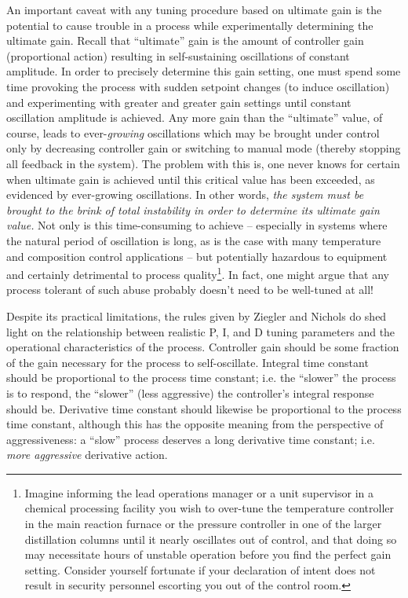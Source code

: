 An important caveat with any tuning procedure based on ultimate gain is the potential to cause trouble in a process while experimentally determining the ultimate gain.  Recall that ``ultimate'' gain is the amount of controller gain (proportional action) resulting in self-sustaining oscillations of constant amplitude.  In order to precisely determine this gain setting, one must spend some time provoking the process with sudden setpoint changes (to induce oscillation) and experimenting with greater and greater gain settings until constant oscillation amplitude is achieved.  Any more gain than the ``ultimate'' value, of course, leads to ever-\textit{growing} oscillations which may be brought under control only by decreasing controller gain or switching to manual mode (thereby stopping all feedback in the system).  The problem with this is, one never knows for certain when ultimate gain is achieved until this critical value has been exceeded, as evidenced by ever-growing oscillations.  In other words, \textit{ the system must be brought to the brink of total instability in order to determine its ultimate gain value.}  Not only is this time-consuming to achieve -- especially in systems where the natural period of oscillation is long, as is the case with many temperature and composition control applications -- but potentially hazardous to equipment and certainly detrimental to process quality\footnote{Imagine informing the lead operations manager or a unit supervisor in a chemical processing facility you wish to over-tune the temperature controller in the main reaction furnace or the pressure controller in one of the larger distillation columns until it nearly oscillates out of control, and that doing so may necessitate hours of unstable operation before you find the perfect gain setting.  Consider yourself fortunate if your declaration of intent does not result in security personnel escorting you out of the control room.}.  In fact, one might argue that any process tolerant of such abuse probably doesn't need to be well-tuned at all!

Despite its practical limitations, the rules given by Ziegler and Nichols do shed light on the relationship between realistic P, I, and D tuning parameters and the operational characteristics of the process.  Controller gain should be some fraction of the gain necessary for the process to self-oscillate.  Integral time constant should be proportional to the process time constant; i.e. the ``slower'' the process is to respond, the ``slower'' (less aggressive) the controller's integral response should be.  Derivative time constant should likewise be proportional to the process time constant, although this has the opposite meaning from the perspective of aggressiveness: a ``slow'' process deserves a long derivative time constant; i.e. \textit{more aggressive} derivative action.








